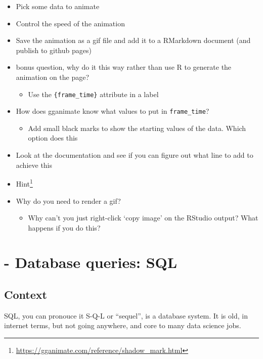 \documentclass[
  12pt,
  a5paper,
]{book}
\DeclareRobustCommand{\href}[2]{#2\footnote{\url{#1}}}
\providecommand{\tightlist}{%
  \setlength{\itemsep}{0pt}\setlength{\parskip}{0pt}}
\begin{document}
\begin{itemize}
\tightlist
\item
  Pick some data to animate
\item
  Control the speed of the animation
\item
  Save the animation as a gif file and add it to a RMarkdown document (and publish to github pages)
\item
  bonus question, why do it this way rather than use R to generate the animation on the page?

  \begin{itemize}
  \tightlist
  \item
    Use the \texttt{\{frame\_time\}} attribute in a label
  \end{itemize}
\item
  How does gganimate know what values to put in \texttt{frame\_time}?

  \begin{itemize}
  \tightlist
  \item
    Add small black marks to show the starting values of the data. Which option does this
  \end{itemize}
\item
  Look at the documentation and see if you can figure out what line to add to achieve this
\item
  \href{https://gganimate.com/reference/shadow_mark.html}{Hint}
\item
  Why do you need to render a gif?

  \begin{itemize}
  \tightlist
  \item
    Why can't you just right-click `copy image' on the RStudio output? What happens if you do this?
  \end{itemize}
\end{itemize}

\hypertarget{database-queries-sql}{%
\chapter*{- Database queries: SQL}\label{database-queries-sql}}


\hypertarget{context}{%
\section{Context}\label{context}}

SQL, you can pronouce it S-Q-L or ``sequel'', is a database system. It is old, in internet terms, but not going anywhere, and core to many data science jobs.
\end{document}
